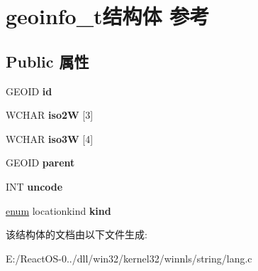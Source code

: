 \hypertarget{structgeoinfo__t}{}\section{geoinfo\+\_\+t结构体 参考}
\label{structgeoinfo__t}
\subsection*{Public 属性}
\begin{DoxyCompactItemize}
\item 
\mbox{\label{structgeoinfo__t_a8e85f3149e209ab0fd59941f4c3a4b52}} 
G\+E\+O\+ID {\bfseries id}
\item 
\mbox{\label{structgeoinfo__t_aad085a41d1da4499f5d09ff202809380}} 
W\+C\+H\+AR {\bfseries iso2W} \mbox{[}3\mbox{]}
\item 
\mbox{\label{structgeoinfo__t_af342fbaf5cf218740e7633e1429b0d0b}} 
W\+C\+H\+AR {\bfseries iso3W} \mbox{[}4\mbox{]}
\item 
\mbox{\label{structgeoinfo__t_a773a5e9abdec7a998b36d64795113c47}} 
G\+E\+O\+ID {\bfseries parent}
\item 
\mbox{\label{structgeoinfo__t_a4b0c0e05038d7cf924dc4cad09810838}} 
I\+NT {\bfseries uncode}
\item 
\mbox{\label{structgeoinfo__t_a6b78ba735dc1dd58c590a88f788e28cd}} 
\hyperlink{interfaceenum}{enum} locationkind {\bfseries kind}
\end{DoxyCompactItemize}


该结构体的文档由以下文件生成\+:\begin{DoxyCompactItemize}
\item 
E\+:/\+React\+O\+S-\/0../dll/win32/kernel32/winnls/string/lang.\+c\end{DoxyCompactItemize}

